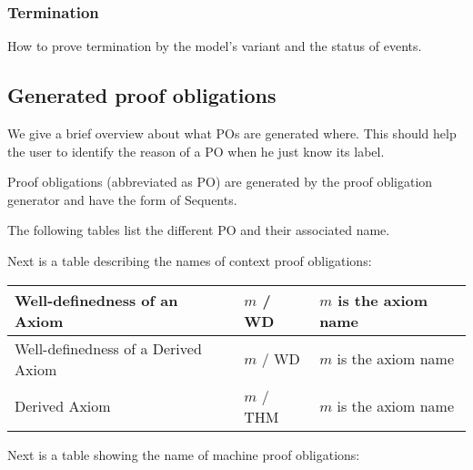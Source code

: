 \subsubsection{Termination}
\label{termination}



How to prove termination by the model's variant and the status of events.
  
\subsection{Generated proof obligations}

We give a brief overview about what POs are generated where. This should help the user to identify the reason of a PO when he just know its label.


Proof obligations (abbreviated as PO) are generated by the proof obligation generator and have the form of Sequents. 

The following tables list the different PO and their associated name.

Next is a table describing the names of context proof obligations: 

\begin{center}
    \begin{tabular}{| p{6cm} | p{3cm} | p{5cm} |}
    \hline
	Well-definedness of an Axiom & $m$ / WD & $m$ is the axiom name\\ \hline
	Well-definedness of a Derived Axiom & $m$  / WD & $m$ is the axiom name \\ \hline
	Derived Axiom & $m$  / THM & $m$ is the axiom name \\ \hline
    \end{tabular}
\end{center}

Next is a table showing the name of machine proof obligations:

